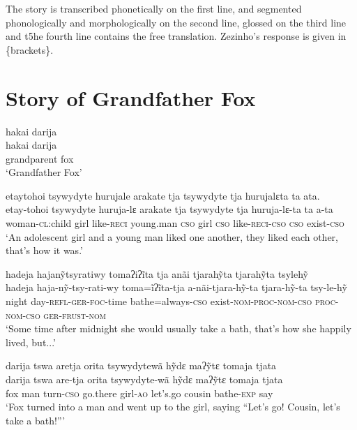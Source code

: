 \documentclass[output=paper,
modfonts,nonflat
]{langsci/langscibook}
\begin{document}
  The story is transcribed phonetically on the first line, and segmented phonologically and  morphologically on the second line, glossed on the third line and t5he fourth line contains the free translation. Zezinho’s response is given in \{brackets\}. 

\section{Story of Grandfather Fox}

\ea  hakai darija\\[.6em]
\gll hakai      darija\\
     grandparent   fox\\
\glt ‘Grandfather Fox’
\z 

\ea  etaytohoi tsywydyte hurujale arakate tja tsywydyte tja hurujalɛta ta ata.\\[.6em]
\gll etay-tohoi      tsywydyte  huruja-lɛ  arakate    tja    tsywydyte  tja    huruja-lɛ-ta    ta    a-ta\\
     woman-\textsc{cl}:child  girl      like-\textsc{reci} young.man  \textsc{cso}  girl      \textsc{cso}  like-\textsc{reci-cso}    \textsc{cso}  exist-\textsc{cso}\\
\glt ‘An adolescent girl and a young man liked one another, they liked each other, that’s how it was.’
\z

\ea  hadeja hajanỹtsyratiwy tomaʔiʔĩta tja anãi tjarahỹta tjarahỹta tsylehỹ\\[.6em]
\gll hadeja  haja-nỹ-tsy-rati-wy    toma=ĩʔĩta-tja    a-nãi-tjara-hỹ-ta{\footnotemark}    tjara-hỹ-ta    tsy-le-hỹ\\
     night  day-\textsc{refl-ger-foc}{}-time  bathe=always-\textsc{cso} exist\textsc{{}-nom-proc-nom-cso}  \textsc{proc-nom-cso}  \textsc{ger-frust-nom}\\
\glt ‘Some time after midnight she would usually take a bath, that’s how she happily lived, but...’
\z
{}

\ea  darija tswa aretja orita tsywydytewã hỹdɛ maʔỹtɛ tomaja tjata\\[.6em]
\gll darija  tswa  are-tja    orita    tsywydyte-wã  hỹdɛ    maʔỹtɛ    tomaja  tjata\\
     fox  man  turn-\textsc{cso}  go.there  girl-\textsc{ao} let’s.go  cousin    bathe-\textsc{exp}  say\\
\glt ‘Fox turned into a man and went up to the girl, saying “Let’s go! Cousin, let’s take a bath!”’ 
\z

{\sloppy
\printbibliography[heading=subbibliography,notkeyword=this]
}
\end{document}
